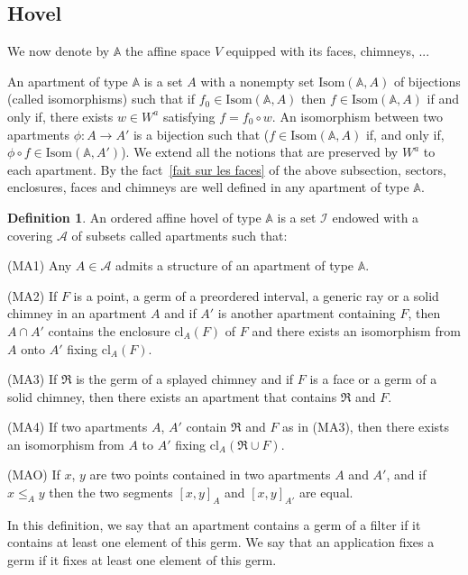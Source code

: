 \documentclass[12pt]{article}
\theoremstyle{plain}
\theoremstyle{definition}
\newtheorem{defn}[thm]{Definition}
\newcommand{\A}{\mathbb{A}}
\begin{document}
\subsection{Hovel}
We now denote by $\A$ the affine space $V$ equipped with its faces, chimneys, ...


An apartment of type $\A$ is a set $A$ with a nonempty set $\mathrm{Isom}(\A,A)$ of bijections (called isomorphisms) such that if $f_0\in \mathrm{Isom}(\A,A)$ then $f\in \mathrm{Isom}(\A,A)$ if and only if, there exists $w\in W^a$ satisfying $f=f_0\circ w$. An isomorphism between two apartments $\phi:A\rightarrow A'$ is a bijection such that ($f\in \mathrm{Isom}(\mathbb{A},A)$ if, and only if, $\phi \circ f\in \mathrm{Isom}(\A,A')$). We extend all the notions that are preserved by $W^a$ to each apartment. By the fact~\ref{fait sur les faces} of the above subsection, sectors, enclosures, faces and chimneys are well defined in any apartment of type $\A$.

\begin{defn}
An ordered affine hovel of type $\A$ is a set $\mathcal{I}$ endowed with a covering $\mathcal{A}$ of subsets called apartments such that: 

(MA1) Any $A\in \mathcal{A}$ admits a structure of an apartment of type $\A$.

(MA2) If $F$ is a point, a germ of a preordered interval, a generic ray or a solid chimney in an apartment $A$ and if $A'$ is another apartment containing $F$, then $A\cap A'$ contains the enclosure $\mathrm{cl}_A(F)$ of $F$ and there exists an isomorphism from $A$ onto $A'$ fixing $\mathrm{cl}_A(F)$.

(MA3) If $\mathfrak{R}$ is the germ of a splayed chimney and if $F$ is a face or a germ of a solid chimney, then there exists an apartment that contains $\mathfrak{R}$ and $F$.

(MA4) If two apartments $A$, $A'$ contain $\mathfrak{R}$ and $F$ as in (MA3), then there exists an isomorphism from $A$ to $A'$ fixing $\mathrm{cl}_A(\mathfrak{R}\cup F)$.

(MAO) If $x$, $y$ are two points contained in two apartments $A$ and $A'$, and if $x\leq_{A} y$ then the two segments $[x,y]_A$ and $[x,y]_{A'}$ are equal.
\end{defn}


In this definition, we say that an apartment contains a germ of a filter if it contains at least one element of this germ. We say that an application fixes a germ if it fixes at least one element of this germ.
\end{document}
